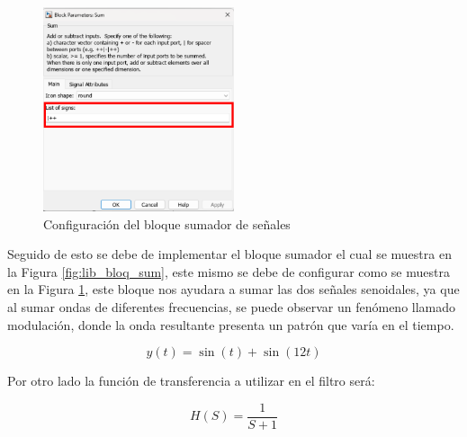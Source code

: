 \begin{figure}[h!]
    \centering
    \includegraphics[width=0.5\textwidth]{fig/especifico_2/CASO_ESTUDIO_FILTRO/sum_1.pdf}
    \caption{Configuración del bloque sumador de señales}
    \label{fig:lib_bloq_sum_conf}
\end{figure}


Seguido de esto se debe de implementar el bloque sumador el cual se muestra en la Figura \ref{fig:lib_bloq_sum}, este mismo se debe de configurar como se muestra en la Figura \ref{fig:lib_bloq_sum_conf}, este bloque nos ayudara a sumar las dos señales senoidales, ya que al sumar ondas de diferentes frecuencias, se puede observar un fenómeno llamado modulación, donde la onda resultante presenta un patrón que varía en el tiempo.

\begin{equation}
    y(t) = \sin(t) + \sin(12t)
    \label{eq:funcion_de_suma_de_ondas}
\end{equation}
\newpage

Por otro lado la función de transferencia a utilizar en el filtro será:

\begin{equation}
    H(S) = \frac{1}{S+1}
    \label{eq:funcion_de_transferencia_filtro}
\end{equation}

